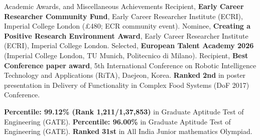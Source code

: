

\begin{rubric}{Academic Awards, and Miscellaneous Achievements}
    \entry*[16/09/26] Recipient, \textbf{Early Career Researcher Community Fund}, Early Career Researcher Institute (ECRI), Imperial College London (\pounds480; ECR community event).
    \entry*[2026] Nominee, \textbf{Creating a Positive Research Environment Award}, Early Career Researcher Institute (ECRI), Imperial College London.
    \entry*[15/12/25] Selected, \textbf{European Talent Academy 2026} (Imperial College London, TU Munich, Politecnico di Milano).
    \entry*[2017] Recipient,  \textbf{Best Conference paper award}, 5th International Conference on Robotic Intelligence Technology and Applications (RiTA), Daejeon, Korea.
    \entry*[2017] \textbf{Ranked 2nd}  in poster presentation in Delivery of Functionality in Complex Food Systems (DoF 2017) Conference.
    
    
    \entry*[2011] \textbf{Percentile: 99.12\% (Rank 1,211/1,37,853)} in Graduate Aptitude Test of Engineering (GATE).
    \entry*[2010] \textbf{Percentile: 96.00\%} in Graduate Aptitude Test of Engineering (GATE).
    \entry*[2004] \textbf{Ranked 31st} in All India Junior mathematics Olympiad.
    

\end{rubric}
